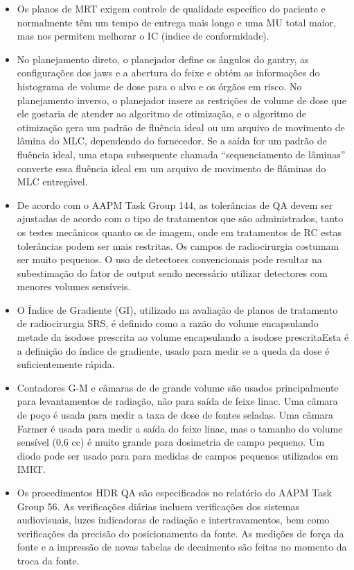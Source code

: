 \documentclass[11pt,a4paper]{article}
\newcounter{exemplo}
\begin{document}
\begin{exemplo}
\begin{itemize}
        \item Os planos de MRT exigem controle de qualidade específico do paciente e normalmente têm um tempo de entrega mais longo e uma MU total maior, mas nos permitem melhorar o IC (indice de conformidade).
        
        \item No planejamento direto, o planejador define os ângulos do gantry, as configurações dos jaws e a abertura do feixe e obtém as informações do histograma de volume de dose para o alvo e os órgãos em risco. No planejamento inverso, o planejador insere as restrições de volume de dose que ele gostaria de atender ao algoritmo de otimização, e o algoritmo de otimização gera um padrão de fluência ideal ou um arquivo de movimento de lâmina do MLC, dependendo do fornecedor. Se a saída for um padrão de fluência ideal, uma etapa subsequente chamada “sequenciamento de lâminas” converte essa fluência ideal em um arquivo de movimento de flâminas do MLC entregável.
        
        \item De acordo com o AAPM Task Group 144, as tolerâncias de QA devem ser ajustadas de acordo com o tipo de tratamentos que são administrados, tanto os testes mecânicos quanto os de imagem, onde em tratamentos de RC estas tolerâncias podem ser mais restritas. Os campos de radiocirurgia costumam ser muito pequenos. O uso de detectores convencionais pode resultar na subestimação do fator de output sendo necessário utilizar detectores com menores volumes sensíveis.
        
        \item O Índice de Gradiente (GI), utilizado na avaliação de planos de tratamento de radiocirurgia SRS, é definido como a razão  do volume encapsulando metade da isodose prescrita ao volume encapsulando a isodose prescritaEsta é a definição do índice de gradiente, usado para medir se a queda da dose é suficientemente rápida.
        
        \item  Contadores G-M e câmaras de  de grande volume são usados principalmente para levantamentos de radiação, não para saída de feixe linac. Uma câmara de poço é usada para medir a taxa de dose de fontes seladas. Uma câmara Farmer é usada para medir a saída do feixe linac, mas o tamanho do volume sensível (0,6 cc) é muito grande para dosimetria de campo pequeno. Um diodo pode ser usado para para medidas de campos pequenos utilizados em IMRT.
        
        \item Os procedimentos HDR QA são especificados no relatório do AAPM Task Group 56. As verificações diárias incluem verificações dos sistemas audiovisuais, luzes indicadoras de radiação e intertravamentos, bem como verificações da precisão do posicionamento da fonte. As medições de força da fonte e a impressão de novas tabelas de decaimento são feitas no momento da troca da fonte.
            

\end{itemize}
\end{exemplo}
\end{document}
